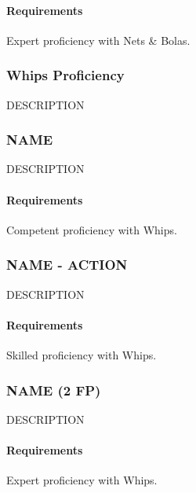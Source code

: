     \paragraph{Requirements} Expert proficiency with Nets \& Bolas.
\subsubsection{Whips Proficiency} \label{feat::name}
    DESCRIPTION
\subsubsection{NAME} \label{feat::name}
    DESCRIPTION
    \paragraph{Requirements} Competent proficiency with Whips.
\subsubsection{NAME - ACTION} \label{feat::name}
    DESCRIPTION
    \paragraph{Requirements} Skilled proficiency with Whips.
\subsubsection{NAME (2 FP)} \label{feat::name}
    DESCRIPTION
    \paragraph{Requirements} Expert proficiency with Whips.


